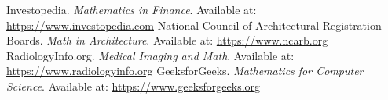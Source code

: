 \documentclass{article}
\begin{document}
\begin{thebibliography}{9}
 Investopedia. \textit{Mathematics in Finance}. Available at: \url{https://www.investopedia.com}
 National Council of Architectural Registration Boards. \textit{Math in Architecture}. Available at: \url{https://www.ncarb.org}
 RadiologyInfo.org. \textit{Medical Imaging and Math}. Available at: \url{https://www.radiologyinfo.org}
 GeeksforGeeks. \textit{Mathematics for Computer Science}. Available at: \url{https://www.geeksforgeeks.org}
 \end{thebibliography}
 
 
\end{document}
